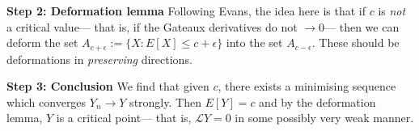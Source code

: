\documentclass[12pt, a4paper]{amsart}
\theoremstyle{remark}
\begin{document}
\textbf{Step 2:  Deformation lemma}  Following Evans, the idea here is that if $c$ is \emph{not} a critical value--- that is, if the Gateaux derivatives do not $\rightarrow 0$--- then we can deform the set $A_{c+\epsilon}:= \lbrace X: E[X]\le c+\epsilon\rbrace$ into the set $A_{c-\epsilon}$.   These should be deformations in  \emph{preserving} directions.   

\textbf{Step 3:  Conclusion }  We find that given $c$, there exists a minimising sequence which converges $Y_n\rightarrow Y$ strongly.  Then $E[Y]=c$ and by the deformation lemma, $Y$ is a critical point--- that is, $\mathcal{L}Y = 0$ in some possibly very weak manner. 

 
\end{document}
